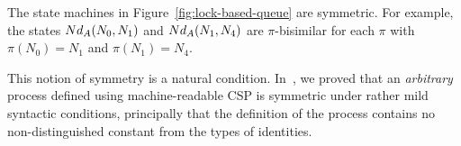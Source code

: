 The state machines in Figure~\ref{fig:lock-based-queue} are symmetric.  For
example, the states $Nd_A(N_0, N_1)$ and $Nd_A(N_1,N_4)$ are
$\pi$-bisimilar for each $\pi$ with $\pi(N_0) = N_1$ and $\pi(N_1) = N_4$.

This notion of symmetry is a natural condition.  In~\cite{gavin-tom-symmetry},
we proved that an \emph{arbitrary} process defined using machine-readable CSP
is symmetric under rather mild syntactic conditions, principally that the
definition of the process contains no non-distinguished constant from the
types of identities.









